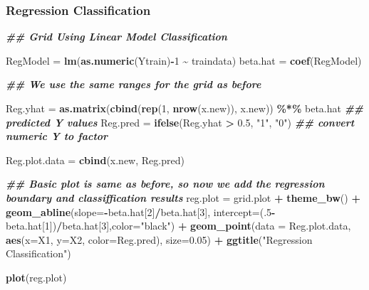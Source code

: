 \documentclass[
]{book}
\newenvironment{Shaded}{\begin{snugshade}}{\end{snugshade}}
\newcommand{\AttributeTok}[1]{\textcolor[rgb]{0.13,0.29,0.53}{#1}}
\newcommand{\DecValTok}[1]{\textcolor[rgb]{0.00,0.00,0.81}{#1}}
\newcommand{\DocumentationTok}[1]{\textcolor[rgb]{0.56,0.35,0.01}{\textbf{\textit{#1}}}}
\newcommand{\FloatTok}[1]{\textcolor[rgb]{0.00,0.00,0.81}{#1}}
\newcommand{\FunctionTok}[1]{\textcolor[rgb]{0.13,0.29,0.53}{\textbf{#1}}}
\newcommand{\NormalTok}[1]{#1}
\newcommand{\OtherTok}[1]{\textcolor[rgb]{0.56,0.35,0.01}{#1}}
\newcommand{\SpecialCharTok}[1]{\textcolor[rgb]{0.81,0.36,0.00}{\textbf{#1}}}
\newcommand{\StringTok}[1]{\textcolor[rgb]{0.31,0.60,0.02}{#1}}
\begin{document}
\subsubsection{Regression Classification}\label{regression-classification}

\begin{Shaded}
\begin{Highlighting}[]
\DocumentationTok{\#\# Grid Using Linear Model Classification}

\NormalTok{RegModel }\OtherTok{=} \FunctionTok{lm}\NormalTok{(}\FunctionTok{as.numeric}\NormalTok{(Ytrain)}\SpecialCharTok{{-}}\DecValTok{1} \SpecialCharTok{\textasciitilde{}}\NormalTok{ traindata)}
\NormalTok{beta.hat }\OtherTok{=} \FunctionTok{coef}\NormalTok{(RegModel)}

\DocumentationTok{\#\# We use the same ranges for the grid as before}

\NormalTok{Reg.yhat }\OtherTok{=} \FunctionTok{as.matrix}\NormalTok{(}\FunctionTok{cbind}\NormalTok{(}\FunctionTok{rep}\NormalTok{(}\DecValTok{1}\NormalTok{, }\FunctionTok{nrow}\NormalTok{(x.new)), x.new)) }\SpecialCharTok{\%*\%}\NormalTok{ beta.hat   }\DocumentationTok{\#\# predicted Y values}
\NormalTok{Reg.pred }\OtherTok{=} \FunctionTok{ifelse}\NormalTok{(Reg.yhat }\SpecialCharTok{\textgreater{}} \FloatTok{0.5}\NormalTok{, }\StringTok{"1"}\NormalTok{, }\StringTok{"0"}\NormalTok{)   }\DocumentationTok{\#\# convert numeric Y to factor}

\NormalTok{Reg.plot.data }\OtherTok{=} \FunctionTok{cbind}\NormalTok{(x.new, Reg.pred)}

\DocumentationTok{\#\# Basic plot is same as before, so now we add the regression boundary and classiffication results}
\NormalTok{reg.plot }\OtherTok{=}\NormalTok{ grid.plot }\SpecialCharTok{+} 
  \FunctionTok{theme\_bw}\NormalTok{() }\SpecialCharTok{+} 
  \FunctionTok{geom\_abline}\NormalTok{(}\AttributeTok{slope=}\SpecialCharTok{{-}}\NormalTok{beta.hat[}\DecValTok{2}\NormalTok{]}\SpecialCharTok{/}\NormalTok{beta.hat[}\DecValTok{3}\NormalTok{], }\AttributeTok{intercept=}\NormalTok{(.}\DecValTok{5}\SpecialCharTok{{-}}\NormalTok{beta.hat[}\DecValTok{1}\NormalTok{])}\SpecialCharTok{/}\NormalTok{beta.hat[}\DecValTok{3}\NormalTok{],}\AttributeTok{color=}\StringTok{"black"}\NormalTok{)  }\SpecialCharTok{+}
  \FunctionTok{geom\_point}\NormalTok{(}\AttributeTok{data =}\NormalTok{ Reg.plot.data, }\FunctionTok{aes}\NormalTok{(}\AttributeTok{x=}\NormalTok{X1, }\AttributeTok{y=}\NormalTok{X2, }\AttributeTok{color=}\NormalTok{Reg.pred), }\AttributeTok{size=}\FloatTok{0.05}\NormalTok{) }\SpecialCharTok{+}
  \FunctionTok{ggtitle}\NormalTok{(}\StringTok{"Regression Classification"}\NormalTok{)}

\FunctionTok{plot}\NormalTok{(reg.plot)}
\end{Highlighting}
\end{Shaded}
\end{document}

